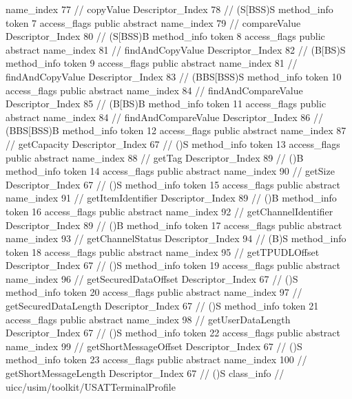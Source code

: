{{{{{					name_index	77		// copyValue
					Descriptor_Index	78		// (S[BSS)S
				}
				method_info {
					token	7
					access_flags	public abstract
					name_index	79		// compareValue
					Descriptor_Index	80		// (S[BSS)B
				}
				method_info {
					token	8
					access_flags	public abstract
					name_index	81		// findAndCopyValue
					Descriptor_Index	82		// (B[BS)S
				}
				method_info {
					token	9
					access_flags	public abstract
					name_index	81		// findAndCopyValue
					Descriptor_Index	83		// (BBS[BSS)S
				}
				method_info {
					token	10
					access_flags	public abstract
					name_index	84		// findAndCompareValue
					Descriptor_Index	85		// (B[BS)B
				}
				method_info {
					token	11
					access_flags	public abstract
					name_index	84		// findAndCompareValue
					Descriptor_Index	86		// (BBS[BSS)B
				}
				method_info {
					token	12
					access_flags	public abstract
					name_index	87		// getCapacity
					Descriptor_Index	67		// ()S
				}
				method_info {
					token	13
					access_flags	public abstract
					name_index	88		// getTag
					Descriptor_Index	89		// ()B
				}
				method_info {
					token	14
					access_flags	public abstract
					name_index	90		// getSize
					Descriptor_Index	67		// ()S
				}
				method_info {
					token	15
					access_flags	public abstract
					name_index	91		// getItemIdentifier
					Descriptor_Index	89		// ()B
				}
				method_info {
					token	16
					access_flags	public abstract
					name_index	92		// getChannelIdentifier
					Descriptor_Index	89		// ()B
				}
				method_info {
					token	17
					access_flags	public abstract
					name_index	93		// getChannelStatus
					Descriptor_Index	94		// (B)S
				}
				method_info {
					token	18
					access_flags	public abstract
					name_index	95		// getTPUDLOffset
					Descriptor_Index	67		// ()S
				}
				method_info {
					token	19
					access_flags	public abstract
					name_index	96		// getSecuredDataOffset
					Descriptor_Index	67		// ()S
				}
				method_info {
					token	20
					access_flags	public abstract
					name_index	97		// getSecuredDataLength
					Descriptor_Index	67		// ()S
				}
				method_info {
					token	21
					access_flags	public abstract
					name_index	98		// getUserDataLength
					Descriptor_Index	67		// ()S
				}
				method_info {
					token	22
					access_flags	public abstract
					name_index	99		// getShortMessageOffset
					Descriptor_Index	67		// ()S
				}
				method_info {
					token	23
					access_flags	public abstract
					name_index	100		// getShortMessageLength
					Descriptor_Index	67		// ()S
				}
			}
		}
		class_info {		// uicc/usim/toolkit/USATTerminalProfile
}}}
